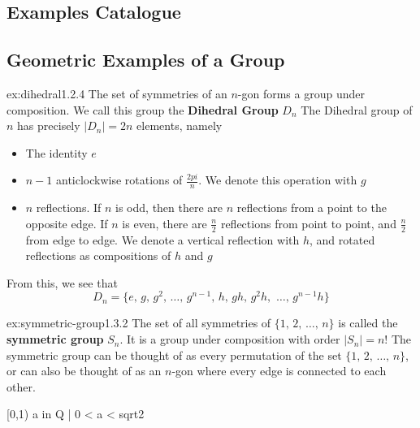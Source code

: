 \documentclass[landscape, 8pt]{extarticle}
\begin{document}
\begin{multicols}{3}
\section{Examples Catalogue}

\subsection*{Geometric Examples of a Group}

\begin{xmp}{ex:dihedral}{1.2.4}
The set of symmetries of an $n$-gon forms a group under composition. We call this group the \textbf{Dihedral Group} $D_{n}$
\vspace{0pt}\newline
The Dihedral group of $n$ has precisely $\lvert D_{n} \rvert = 2n$ elements, namely
\renewcommand\labelitemi{\tiny$\bullet$}
\begin{itemize}
    \setlength\itemsep{0em}
    \item The identity $e$
    \item $n- 1$ anticlockwise rotations of $\frac{2pi}{n}$. We denote this operation with $g$
    \item $n$ reflections. If $n$ is odd, then there are $n$ reflections from a point to the opposite edge. If $n$ is even, there are $\frac{n}{2}$ reflections from point to point, and $\frac{n}{2}$ from edge to edge. We denote a vertical reflection with $h$, and rotated reflections as compositions of $h$ and $g$ 
\end{itemize}
From this, we see that
\[D_{n} = \{e,\,g,\,g^{2},\,\dots,\,g^{n-1},\, h,\, gh,\, g^{2}h,\,\,\dots,\, g^{n-1}h \}\]
\end{xmp}
\vspace{-5pt}

\begin{xmp}{ex:symmetric-group}{1.3.2}
The set of all symmetries of $\{1,\, 2,\,\dots,\,n\}$ is called the \textbf{symmetric group} $S_{n}$. It is a group under composition with order $\lvert S_{n}  \rvert = n!$ The symmetric group can be thought of as every permutation of the set $\{1,\, 2,\,\dots,\,n\}$, or can also be thought of as an $n$-gon where every edge is connected to each other. 
\end{xmp}
\vspace{-5pt}


[0,1) 
{a in Q | 0 < a < sqrt2}



\end{multicols}
\end{document}
